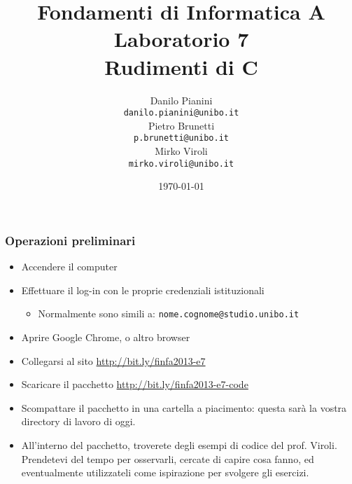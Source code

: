 \documentclass{beamer}
\begin{document}
\title[Lab1 - FV]{Fondamenti di Informatica A \\ Laboratorio 7 \\ Rudimenti di C}
\author[Danilo Pianini]{Danilo Pianini\\\texttt{danilo.pianini@unibo.it} \\ \vspace{3pt} Pietro Brunetti \\\texttt{p.brunetti@unibo.it} \\ \vspace{3pt} Mirko Viroli\\\texttt{mirko.viroli@unibo.it} }
\date[\today]{\today}

\frame{\titlepage} 

\begin{frame}
\frametitle{Operazioni preliminari}
\begin{itemize}
 \item Accendere il computer
 \item Effettuare il log-in con le proprie credenziali istituzionali
  \begin{itemize}
    \item Normalmente sono simili a: \texttt{nome.cognome@studio.unibo.it}
  \end{itemize}
 \item Aprire Google Chrome, o altro browser
 \item Collegarsi al sito \url{http://bit.ly/finfa2013-e7}
 \item Scaricare il pacchetto \url{http://bit.ly/finfa2013-e7-code}
 \item Scompattare il pacchetto in una cartella a piacimento: questa sarà la vostra directory di lavoro di oggi.
 \item All'interno del pacchetto, troverete degli esempi di codice del prof. Viroli. Prendetevi del tempo per osservarli, cercate di capire cosa fanno, ed eventualmente utilizzateli come ispirazione per svolgere gli esercizi.
\end{itemize}
\end{frame}
\end{document}
